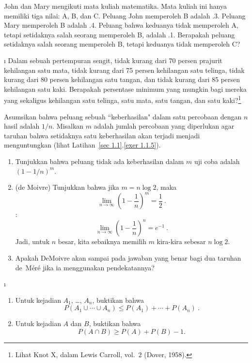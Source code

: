 \begin{LJSItem}
\istar\label{exer 1.2.14} John dan Mary mengikuti mata kuliah matematika.  Mata kuliah ini
hanya memiliki
tiga nilai: A, B, dan C.  Peluang John memperoleh B adalah .3.  Peluang
Mary memperoleh B adalah .4.  Peluang bahwa keduanya tidak memperoleh A,
tetapi setidaknya salah seorang memperoleh B, adalah .1.  Berapakah peluang setidaknya salah seorang
memperoleh B, tetapi keduanya tidak memperoleh C?

\i\label{exer 1.2.15} Dalam sebuah pertempuran sengit, tidak kurang dari 70 persen
prajurit kehilangan satu
mata, tidak kurang dari 75 persen kehilangan satu telinga, tidak kurang dari 80 persen kehilangan satu
tangan, dan tidak kurang dari 85 persen kehilangan satu kaki.  Berapakah persentase minimum yang
mungkin
bagi mereka yang sekaligus kehilangan satu telinga, satu mata, satu tangan, dan
satu
kaki?\footnote{Lihat Knot X, dalam Lewis Carroll, 
vol.~2 (Dover, 1958).}

\istar\label{exer 1.2.16}
Asumsikan bahwa peluang sebuah ``keberhasilan" dalam
satu percobaan dengan $n$ hasil adalah $1/n$.  Misalkan $m$ adalah jumlah
percobaan yang diperlukan agar taruhan bahwa setidaknya satu keberhasilan
akan
terjadi menjadi menguntungkan (lihat Latihan~\ref{sec 1.1}.\ref{exer 1.1.5}).

\begin{enumerate}
\item Tunjukkan bahwa peluang tidak ada keberhasilan dalam $m$ uji coba
adalah $(1 - 1/n)^m$.

\item (de Moivre) Tunjukkan bahwa jika $m = n \log 2$, maka
$$
\lim_{n \to \infty} \left(1 - \frac1n \right)^m = \frac12\ .
$$
:
$$
\lim_{n \to \infty} \left(1 - \frac1n \right)^n = e^{-1}\ .
$$
Jadi, untuk $n$ besar, kita sebaiknya memilih $m$ kira-kira sebesar $n \log 2$.

\item Apakah DeMoivre akan sampai pada jawaban yang benar bagi dua taruhan de~M\'er\'e
jika ia menggunakan pendekatannya?
\end{enumerate}

\i\label{exer 1.2.17}
\begin{enumerate}
\item Untuk kejadian $A_1$, \dots, $A_n$, buktikan bahwa 
$$P(A_1 \cup \cdots \cup A_n) \leq P(A_1) + \cdots + P(A_n)\ .$$
\item Untuk kejadian $A$ dan $B$, buktikan bahwa
$$
P(A \cap B) \geq P(A) + P(B) - 1.
$$
\end{enumerate}


\end{LJSItem}
